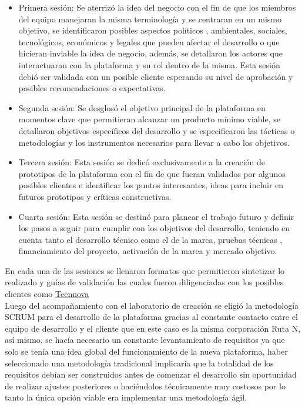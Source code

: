 \begin{itemize}
    \item Primera sesión: Se aterrizó la idea del negocio con el fin de que los miembros del equipo manejaran la misma terminología y se centraran en un mismo objetivo, se identificaron posibles aspectos políticos , ambientales, sociales, tecnológicos, económicos y legales que pueden afectar el desarrollo o que hicieran inviable la idea de negocio, además, se detallaron los actores que interactuaran con la plataforma y su rol dentro de la misma. Esta sesión debió ser validada con un posible cliente esperando su nivel de aprobación y posibles recomendaciones o expectativas.
    \item  Segunda sesión: Se desglosó el objetivo principal de la plataforma en momentos clave que permitieran alcanzar un producto mínimo viable, se detallaron objetivos específicos del desarrollo y se especificaron las tácticas o metodologías y los instrumentos necesarios para llevar a cabo los objetivos. 
    \item Tercera sesión: Esta sesión se dedicó exclusivamente a la creación de prototipos de la plataforma con el fin de que fueran validados por algunos posibles clientes e identificar los puntos interesantes, ideas para incluir en futuros prototipos y críticas constructivas.
    \item Cuarta sesión: Esta sesión se destinó para planear el trabajo futuro y definir los pasos a seguir para cumplir con los objetivos del desarrollo, teniendo en cuenta tanto el desarrollo técnico como el de la marca, pruebas técnicas , financiamiento del proyecto, activación de la marca y mercado objetivo.
\end{itemize}

En cada una de las sesiones se llenaron formatos que permitieron sintetizar lo realizado y guías de validación las cuales fueron diligenciadas con los posibles clientes como \href{http://www.tecnnova.org/}{Tecnnova} \\

Luego del acompañamiento con el laboratorio de creación se eligió la metodología SCRUM para el desarrollo de la plataforma gracias al constante contacto entre el equipo de desarrollo y el cliente que en este caso es la misma corporación Ruta N, así mismo, se hacía necesario un constante levantamiento de requisitos ya que solo se tenía una idea global del funcionamiento de la nueva plataforma, haber seleccionado una metodología tradicional implicaría que la totalidad de los requisitos debían ser construidos antes de comenzar el desarrollo sin oportunidad de realizar ajustes posteriores o haciéndolos técnicamente muy costosos por lo tanto la única opción viable era implementar una metodología ágil.\\


